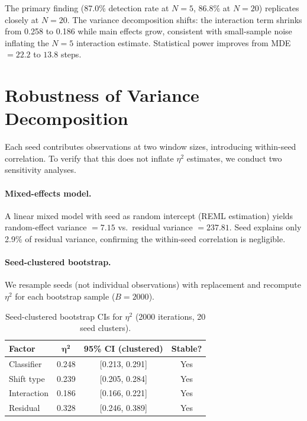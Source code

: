 \documentclass{article}
\begin{document}
The primary finding (87.0\% detection rate at $N{=}5$, 86.8\% at $N{=}20$) replicates closely at $N{=}20$. The variance decomposition shifts: the interaction term shrinks from 0.258 to 0.186 while main effects grow, consistent with small-sample noise inflating the $N{=}5$ interaction estimate. Statistical power improves from MDE $= 22.2$ to $13.8$ steps.

\section{Robustness of Variance Decomposition}
\label{app:anova-robustness}

Each seed contributes observations at two window sizes, introducing within-seed correlation. To verify that this does not inflate $\eta^2$ estimates, we conduct two sensitivity analyses.

\paragraph{Mixed-effects model.} A linear mixed model with seed as random intercept (REML estimation) yields random-effect variance $= 7.15$ vs.\ residual variance $= 237.81$. Seed explains only 2.9\% of residual variance, confirming the within-seed correlation is negligible.

\paragraph{Seed-clustered bootstrap.} We resample seeds (not individual observations) with replacement and recompute $\eta^2$ for each bootstrap sample ($B{=}2000$).

\begin{table}[h]
\caption{Seed-clustered bootstrap CIs for $\eta^2$ (2000 iterations, 20 seed clusters).}
\centering
\small
\begin{tabular}{lccc}
\toprule
\textbf{Factor} & $\boldsymbol{\eta^2}$ & \textbf{95\% CI (clustered)} & \textbf{Stable?} \\
\midrule
Classifier & 0.248 & [0.213, 0.291] & Yes \\
Shift type & 0.239 & [0.205, 0.284] & Yes \\
Interaction & 0.186 & [0.166, 0.221] & Yes \\
Residual & 0.328 & [0.246, 0.389] & Yes \\
\bottomrule
\end{tabular}
\end{table}
\end{document}
